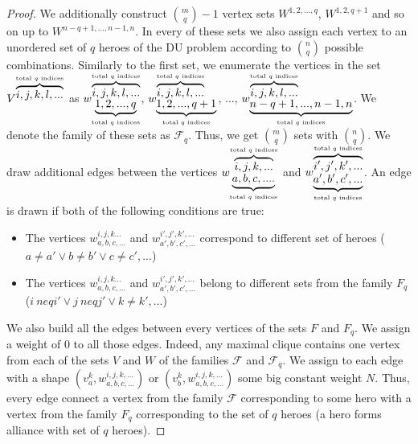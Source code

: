 \documentclass[smallextended]{svjour3}       %
\begin{document}
\begin{proof}
We additionally construct $ \binom{m}{q}-1 $ vertex sets $ W^{1,2, ..., q} $, $W^{1,2, q + 1} $ and so on up to $ W^{n-q + 1, ..., n-1, n} $. In every of these sets we also assign each vertex to an unordered set of $q$ heroes of the DU problem according to $\binom{n}{q}$ possible combinations. Similarly to the first set, we enumerate the vertices in the set $V^{\overbrace {i, j, k, l, ...}^\text {total $ q $ indices}} $ as $w_{\underbrace {1,2, ..., q}_\text {total $ q $ indices}}^{\overbrace{i, j, k, l, ...}^\text{total $ q $ indices}} $, $w_{ \underbrace {1,2, ..., q + 1}_\text{total $ q $ indices}}^{\overbrace{i, j, k, l, ...} ^\text{total $ q $ indices}} $,  ..., $w_{\underbrace {n-q + 1, ..., n-1, n}_\text{total $ q $ indices}}^{\overbrace { i, j, k, l, ...}^\text {total $ q $ indices}} $.
    We denote the family of these sets as $ \mathcal {F} _q $. Thus, we get $ \binom{m}{q} $ sets with $ \binom{n}{q} $.
    We draw additional edges between the vertices $w_{\underbrace{a, b, c, ....}_\text{total $ q $ indices}}^{\overbrace{i, j, k , ...}^\text{total $ q $ indices}} $ and $w_{\underbrace{a',b', c', ...}_\text{total $ q $ indices}}^{\overbrace {i ', j', k ', ...}^\text{total $ q $ indices}}$. An edge is drawn if both of the following conditions are true:
    \begin{itemize}
        \item The vertices $w_{a, b, c, ...}^{i, j, k ...} $ and $ w_ {a', b', c', ...}^{i', j', k', ...}$ correspond to different set of heroes ($ a \neq a '\lor b \neq b' \lor c \neq c', ... $)
        \item The vertices $ w_{a, b, c, ...}^ {i, j, k ...} $ and $ w_{a', b', c',...}^{i', j', k', ...} $ belong to different sets from the family $ F_q $ ($ i \ neq i'\lor j \ neq j' \lor k \neq k', ... $)
    \end {itemize}
    
    We also build all the edges between every vertices of the sets $ F $ and $ F_q $. We assign a weight of 0 to all those edges. Indeed, any maximal clique contains one vertex from each of the sets $ V $ and $ W $ of the families $\mathcal {F}$ and $\mathcal {F}_q$. We assign to each edge with a shape $ (v_a^k, w_ {a, b, c, ...}^ {i, j, k, ...}) $ or $ (v_b^k, w_{a, b, c , ...}^{i, j, k, ...}) $ some big constant weight $ N $. Thus, every edge connect a vertex from the family $ \mathcal{F} $ corresponding to some hero with a vertex from the family $ F_q $ corresponding to the set of $ q $ heroes (a hero forms alliance with set of $q$ heroes). 
    

\end{proof}
\end{document}
